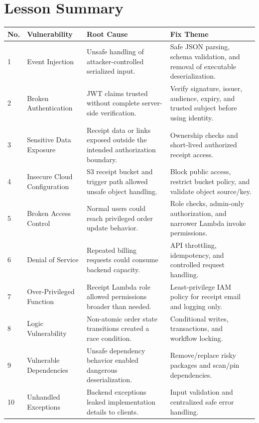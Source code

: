 \documentclass[12pt]{article}
\begin{document}
\section*{Lesson Summary}

\begin{longtable}{p{}p{}p{}p{}}
\toprule
No. & Vulnerability & Root Cause & Fix Theme \\
\midrule
1 & Event Injection & Unsafe handling of attacker-controlled serialized input. & Safe JSON parsing, schema validation, and removal of executable deserialization. \\
2 & Broken Authentication & JWT claims trusted without complete server-side verification. & Verify signature, issuer, audience, expiry, and trusted subject before using identity. \\
3 & Sensitive Data Exposure & Receipt data or links exposed outside the intended authorization boundary. & Ownership checks and short-lived authorized receipt access. \\
4 & Insecure Cloud Configuration & S3 receipt bucket and trigger path allowed unsafe object handling. & Block public access, restrict bucket policy, and validate object source/key. \\
5 & Broken Access Control & Normal users could reach privileged order update behavior. & Role checks, admin-only authorization, and narrower Lambda invoke permissions. \\
6 & Denial of Service & Repeated billing requests could consume backend capacity. & API throttling, idempotency, and controlled request handling. \\
7 & Over-Privileged Function & Receipt Lambda role allowed permissions broader than needed. & Least-privilege IAM policy for receipt email and logging only. \\
8 & Logic Vulnerability & Non-atomic order state transitions created a race condition. & Conditional writes, transactions, and workflow locking. \\
9 & Vulnerable Dependencies & Unsafe dependency behavior enabled dangerous deserialization. & Remove/replace risky packages and scan/pin dependencies. \\
10 & Unhandled Exceptions & Backend exceptions leaked implementation details to clients. & Input validation and centralized safe error handling. \\
\bottomrule
\end{longtable}
\end{document}
